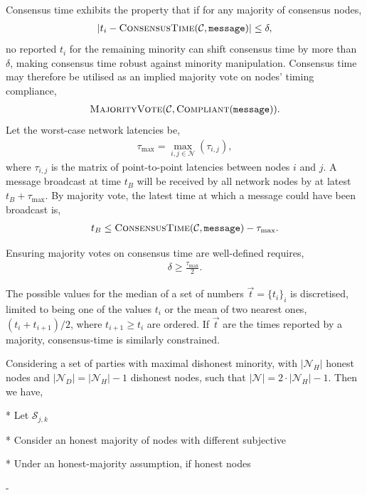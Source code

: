 Consensus time exhibits the property that if for any majority of consensus nodes,
\begin{align}
	|t_i - \textsc{ConsensusTime}(\mathcal{C},\texttt{message})|	\leq \delta,
\end{align}
no reported $t_i$ for the remaining minority can shift consensus time by more than $\delta$, making consensus time robust against minority manipulation. Consensus time may therefore be utilised as an implied majority vote on nodes' timing compliance,
\begin{align}
	\textsc{MajorityVote}(\mathcal{C}, \textsc{Compliant}(\texttt{message})).
\end{align}
Let the worst-case network latencies be,
\begin{align}
	\tau_\mathrm{max} = \max_{i,j\in\mathcal{N}}(\tau_{i,j}),
\end{align}
where $\tau_{i,j}$ is the matrix of point-to-point latencies between nodes $i$ and $j$. A message broadcast at time $t_B$ will be received by all network nodes by at latest $t_B+\tau_\mathrm{max}$.
By majority vote, the latest time at which a message could have been broadcast is,
\begin{align}
	t_B \leq \textsc{ConsensusTime}(\mathcal{C},\texttt{message}) - \tau_\mathrm{max}.
\end{align}

Ensuring majority votes on consensus time are well-defined requires,
\begin{align}
	\delta \geq \frac{\tau_\mathrm{max}}{2}.
\end{align}

The possible values for the median of a set of numbers $\vec{t}=\{t_i\}_i$ is discretised, limited to being one of the values $t_i$ or the mean of two nearest ones, $(t_i+t_{i+1})/2$, where $t_{i+1}\geq t_i$ are ordered. If $\vec{t}$ are the times reported by a majority, consensus-time is similarly constrained.

Considering a set of parties with maximal dishonest minority, with $|\mathcal{N}_H|$ honest nodes and $|\mathcal{N}_D|=|\mathcal{N}_H|-1$ dishonest nodes, such that $|\mathcal{N}|=2\cdot|\mathcal{N}_H|-1$. Then we have,


* Let $\mathcal{S}_{j,k}$

* Consider an honest majority of nodes with different subjective


* Under an honest-majority assumption, if honest nodes 

-

